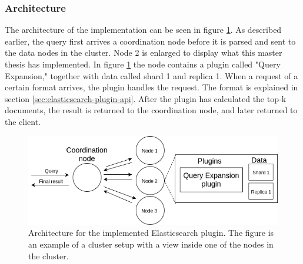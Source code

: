 \subsubsection{Architecture}
The architecture of the implementation can be seen in figure \ref{fig:elasticsearch-architecture}.
As described earlier,
the query first arrives a coordination node before it is parsed and sent to the data nodes in the cluster.
Node 2 is enlarged to display what this master thesis has implemented.
In figure \ref{fig:elasticsearch-architecture} the node contains a plugin called "Query Expansion,"
together with data called shard 1 and replica 1.
When a request of a certain format arrives, the plugin handles the request.
The format is explained in section \ref{sec:elasticsearch-plugin-api}.
After the plugin has calculated the top-k documents, the result is returned to the coordination node,
and later returned to the client.

\begin{figure}[h!]
  \centering \includegraphics[width=1\linewidth]{img/elasticsearch-architecture.png}
  \caption{Architecture for the implemented Elasticsearch plugin. The figure is an example of a cluster setup with a view inside one of the nodes in the cluster.}
  \label{fig:elasticsearch-architecture}
\end{figure}

